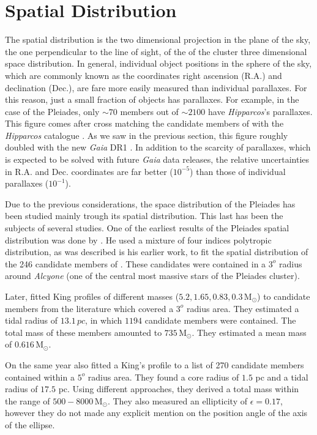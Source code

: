 \section{Spatial Distribution}
The spatial distribution is the two dimensional projection in the plane of the sky, the one perpendicular to the line of sight, of the of the cluster three dimensional space distribution. In general, individual object positions in the sphere of the sky, which are commonly known as the coordinates right ascension (R.A.) and declination (Dec.), are fare more easily measured than individual parallaxes. For this reason, just a small fraction of objects has parallaxes. For example, in the case of the Pleiades, only $\sim70$ members out of $\sim2100$ have \emph{Hipparcos}'s parallaxes. This figure comes after cross matching the candidate members of \citet{Bouy2015} with the \emph{Hipparcos} catalogue \citep{1997A&A...323L..49P}. As we saw in the previous section, this figure roughly doubled with the new \emph{Gaia} DR1 \citep{2016A&A...595A...1G}. In addition to the scarcity of parallaxes, which is expected to be solved with future \emph{Gaia} data releases, the relative uncertainties in R.A. and Dec. coordinates are far better ($10^{-5}$) than those of individual parallaxes ($10^{-1}$).

Due to the previous considerations, the space distribution of the Pleiades has been studied mainly trough its spatial distribution.
This last has been the subjects of several studies. One of the earliest results of the Pleiades spatial distribution was done by \citet{Limber1962}. He used a mixture of four indices polytropic distribution, as was described is his earlier \citet{Limber1961} work, to fit the spatial distribution of the 246 candidate members of \citet{Trumpler1921}. These candidates were contained in a $3^o$ radius around \emph{Alcyone} (one of the central most massive stars of the Pleiades cluster). 

\sloppy
Later, \citet{Pinfield1998} fitted King profiles \citep{King1962} of different masses ($5.2,1.65,0.83,0.3 \, \mathrm{M_{\odot}}$) to candidate members from the literature which covered a $3^o$ radius area. They estimated a tidal radius of $13.1\,pc$, in which $1194$ candidate members were contained. The total mass of these members amounted to $735\,\mathrm{M_{\odot}}$. They estimated a mean mass of $0.616\,\mathrm{M_{\odot}}$. 

On the same year \citet{Raboud1998} also fitted a King's profile \citep{King1962} to a list of 270 candidate members contained within a $5^o$ radius area. They found a core radius of $1.5$ pc and a tidal radius of $17.5$ pc. Using different approaches, they derived a total mass within the range of $500 -8000 \,\mathrm{M_{\odot}}$. They also measured an ellipticity of $\epsilon=0.17$, however they do not made any explicit mention on the position angle of the axis of the ellipse.

